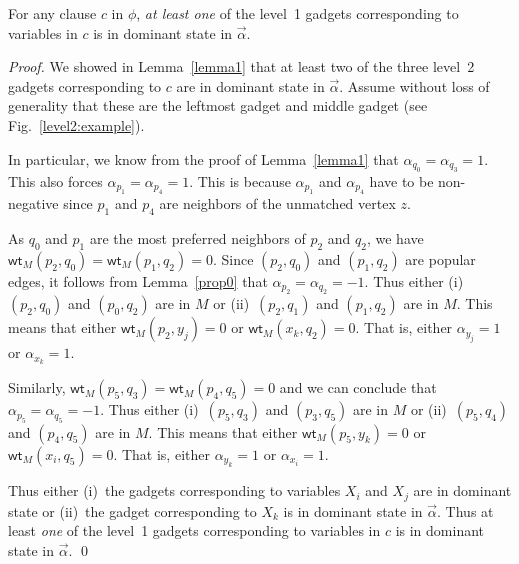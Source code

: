 \documentclass{llncs}
\newcommand{\wt}{\mathsf{wt}}
\begin{document}
\begin{lemma}
  \label{lemma2}
  For any clause $c$ in $\phi$, {\em at least one} of the level~1 gadgets
  corresponding to variables in $c$ is in dominant state in $\vec{\alpha}$.
\end{lemma}
\begin{proof}
  We showed in Lemma~\ref{lemma1} that
  at least two of the three level~2 gadgets corresponding to $c$ are in dominant state in $\vec{\alpha}$. Assume without loss of generality that these
  are the leftmost gadget and middle gadget (see Fig.~\ref{level2:example}).

  In particular, we know from the proof of Lemma~\ref{lemma1} that
  $\alpha_{q_0} = \alpha_{q_3} = 1$. This also forces  $\alpha_{p_1} = \alpha_{p_4} = 1$. This is because $\alpha_{p_1}$ and $\alpha_{p_4}$ have to be
  non-negative since $p_1$ and $p_4$ are neighbors of the unmatched vertex $z$.

  As $q_0$ and $p_1$ are the most preferred neighbors of $p_2$ and $q_2$, we have $\wt_M(p_2,q_0) = \wt_M(p_1,q_2) = 0$.
  Since $(p_2,q_0)$ and $(p_1,q_2)$ are popular edges, it follows from Lemma~\ref{prop0} that
  $\alpha_{p_2} = \alpha_{q_2} = -1$. Thus either (i)~$(p_2,q_0)$ and $(p_0,q_2)$
  are in $M$ or (ii)~$(p_2,q_1)$ and $(p_1,q_2)$ are in $M$. This means that either $\wt_M(p_2,y_j) = 0$ or $\wt_M(x_k,q_2) = 0$. That is, either $\alpha_{y_j} = 1$
  or $\alpha_{x_k} = 1$.

  Similarly, $\wt_M(p_5,q_3) = \wt_M(p_4,q_5) = 0$ and we can conclude that $\alpha_{p_5} = \alpha_{q_5} = -1$.
  Thus either (i)~$(p_5,q_3)$ and $(p_3,q_5)$ are in $M$ or
  (ii)~$(p_5,q_4)$ and $(p_4,q_5)$ are in $M$. This means that either $\wt_M(p_5,y_k) = 0$ or $\wt_M(x_i,q_5) = 0$. That is, either $\alpha_{y_k} = 1$ or $\alpha_{x_i} = 1$.

  Thus either (i)~the gadgets corresponding to variables $X_i$ and $X_j$ are in dominant state or
  (ii)~the gadget corresponding to $X_k$ is in dominant state in $\vec{\alpha}$.
  Thus at least {\em one} of the level~1 gadgets corresponding to variables in $c$ is in dominant state in $\vec{\alpha}$. \qed
\end{proof}
\end{document}
